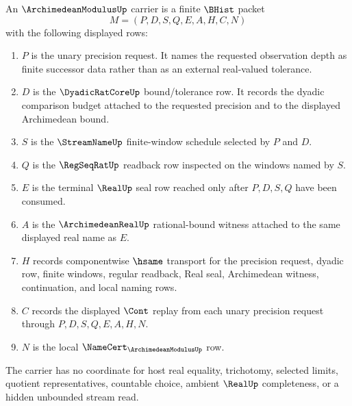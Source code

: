 \begin{definition}
\label{def:archimedean-modulus-carrier}
An $\ArchimedeanModulusUp$ carrier is a finite $\BHist$ packet
$$
M=(P,D,S,Q,E,A,H,C,N)
$$
with the following displayed rows:
\begin{enumerate}
\item $P$ is the unary precision request. It names the requested observation depth as finite successor data rather than as an external real-valued tolerance.
\item $D$ is the $\DyadicRatCoreUp$ bound/tolerance row. It records the dyadic comparison budget attached to the requested precision and to the displayed Archimedean bound.
\item $S$ is the $\StreamNameUp$ finite-window schedule selected by $P$ and $D$.
\item $Q$ is the $\RegSeqRatUp$ readback row inspected on the windows named by $S$.
\item $E$ is the terminal $\RealUp$ seal row reached only after $P,D,S,Q$ have been consumed.
\item $A$ is the $\ArchimedeanRealUp$ rational-bound witness attached to the same displayed real name as $E$.
\item $H$ records componentwise $\hsame$ transport for the precision request, dyadic row, finite windows, regular readback, Real seal, Archimedean witness, continuation, and local naming rows.
\item $C$ records the displayed $\Cont$ replay from each unary precision request through $P,D,S,Q,E,A,H,N$.
\item $N$ is the local $\NameCert_{\ArchimedeanModulusUp}$ row.
\end{enumerate}
The carrier has no coordinate for host real equality, trichotomy, selected limits, quotient representatives, countable choice, ambient $\RealUp$ completeness, or a hidden unbounded stream read.
\end{definition}

